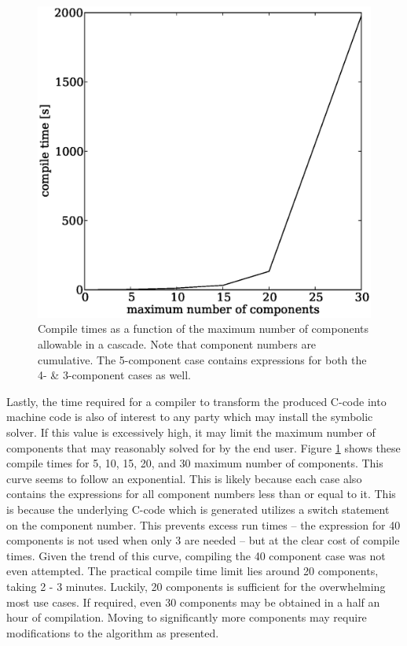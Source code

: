 \documentclass[preprint,12pt]{elsarticle}
\begin{document}
\begin{figure}[htpb]
\begin{center}
\includegraphics[scale=0.5]{compile_times.eps}
\caption{Compile times as a function of the maximum number of components allowable
    in a cascade.  Note that component numbers are cumulative.  The 5-component case 
    contains expressions for both the 4- \& 3-component cases as well.}
\label{compile_times_fig}
\end{center}
\end{figure}

Lastly, the time required for a compiler to transform the produced C-code into 
machine code is also of interest to any party which may install the symbolic solver.
If this value is excessively high, it may limit the maximum number of components
that may reasonably solved for by the end user.  Figure \ref{compile_times_fig}
shows these compile times for 5, 10, 15, 20, and 30 maximum number of components.
This curve seems to follow an exponential.  This is likely because each case also 
contains the expressions for all component numbers less than or equal to it.  This 
is because the underlying C-code which is generated utilizes a switch statement
on the component number.  This prevents excess run times -- the expression for 40 
components is not used when only 3 are needed -- but at the clear cost of compile
times.  Given the trend of this curve, compiling the 40 component 
case was not even attempted.  The practical compile time limit lies around 20 
components, taking 2 - 3  minutes.  Luckily, 20 components is sufficient for the
overwhelming most use cases.  If required,  even 30 components may be obtained in
a half an hour of compilation.  Moving to significantly more components may 
require modifications to the algorithm as presented.
\end{document}
